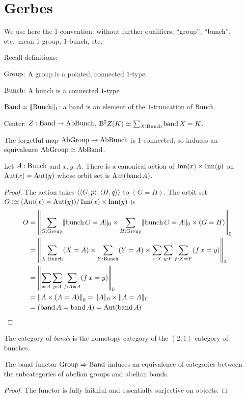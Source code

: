 \chapter{Gerbes}
\label{ch:bunches}

We use here the $1$-convention: without further qualifiers, ``group'',
``bunch'', etc.~mean $1$-group, $1$-bunch, etc.

Recall definitions:

$\mathrm{Group}$: A group is a pointed, connected $1$-type

$\mathrm{Bunch}$: A bunch is a connected $1$-type

$\Band\jdeq\Trunc{\Bunch}_1$: a band is an element of the
$1$-truncation of $\mathrm{Bunch}$.

Center: $Z : \mathrm{Band} \to \mathrm{AbBunch}$, $\B^2Z(K) \jdeq \sum_{X : \Bunch}
\band X = K$.

The forgetful map $\mathrm{AbGroup} \to \mathrm{AbBunch}$ is $1$-connected, so induces
an equivalence $\mathrm{AbGroup} \simeq \mathrm{AbBand}$.

\begin{lemma}
  Let $A : \mathrm{Bunch}$ and $x,y:A$. There is a canonical action of
  $\Inn(x)\times\Inn(y)$ on $\Aut(x) = \Aut(y)$ whose orbit set is
  $\Aut(\band A)$.
\end{lemma}
\begin{proof}
  The action takes $\langle\langle G,p\rangle,\langle H,q\rangle\rangle$ to $(G=H)$.
  The orbit set $O \defeq (\Aut(x)=\Aut(y)) / \Inn(x)\times\Inn(y)$ is
  \begin{align*}
    O
    &= \Trunc*{\sum_{G:\Group}\Trunc{\bunch G=A}_0 \times
      \sum_{H:\Group}\Trunc{\bunch G=A}_0 \times (G = H)}_0 \\
    &= \Trunc*{\sum_{X:\Bunch}(X=A) \times
      \sum_{Y:\Bunch}(Y=A) \times \sum_{x:X}\sum_{y:Y}\sum_{f:X=Y}(\mathop
      f x = y)}_0 \\
    &= \Trunc*{\sum_{x:A}\sum_{y:A}\sum_{f:A=A}(\mathop f x = y)}_0 \\
    &= \Trunc*{A \times (A = A)}_0 = \Trunc A_0 \times \Trunc{A=A}_0 \\
    &= (\band A = \band A) = \Aut(\band A) \qedhere
  \end{align*}
\end{proof}

\begin{definition}
  The category of \emph{bands} is the homotopy category of the
  $(2,1)$-category of bunches.
\end{definition}
\begin{lemma} %
  The band functor $\mathrm{Group} \Rightarrow \mathrm{Band}$ induces an equivalence
  of categories between the subcategories of abelian groups and
  abelian bands.
\end{lemma}
\begin{proof}
  The functor is fully faithful and essentially surjective on objects.
\end{proof}

